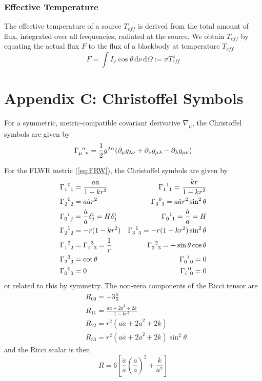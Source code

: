 \subsubsection*{Effective Temperature}
The effective temperature of a source $T_{eff}$ is derived from the total amount of flux, integrated over all frequencies, radiated at the source. We obtain $T_{eff}$ by equating the actual flux $F$ to the flux of a blackbody at temperature $T_{eff}$
\begin{equation}
    F = \int I_{\nu}\cos\theta \,\text{d}\nu\,\text{d}\Omega := \sigma T_{eff}^{4}
    \label{eq:effectivetemperature} 
\end{equation}
\newpage
\section*{Appendix C: Christoffel Symbols}

\par For a symmetric, metric-compatible covariant derivative $\nabla_{\mu}$, the Christoffel symbols are given by
\begin{equation}
    \Gamma_{\mu\;\;\nu}^{\;\;\alpha} = \frac{1}{2}g^{\lambda\alpha}(\partial_{\mu}g_{\lambda\nu}+\partial_{\nu}g_{\mu\lambda}-\partial_{\lambda}g_{\mu\nu})
\end{equation}
\par For the FLWR metric (\ref{eq:FRW}), the Christoffel symbols are given by
\begin{align*}
    & \Gamma_{1\;\;1}^{\;\;0} = \frac{a\dot{a}}{1-kr^{2}} & \Gamma_{1\;\;1}^{\;\;1} = \frac{kr}{1-kr^{2}} \\
    & \Gamma_{2\;\;2}^{\;\;0} = a\dot{a}r^{2} & \Gamma_{3\;\;3}^{\;\;0} = a\dot{a}r^{2}\sin^{2}\theta \\
    & \Gamma_{0\;\;j}^{\;\;i} = \frac{\dot{a}}{a}\delta^{i}_{j}=H\delta^{i}_{j} & \Gamma_{0\;\;1}^{\;\;1} = \frac{\dot{a}}{a} = H \\
    & \Gamma_{2\;\;2}^{\;\;1} = -r(1-kr^{2}) &\Gamma_{3\;\;3}^{\;\;1} = -r(1-kr^{2})\sin^{2}\theta \\
    & \Gamma_{1\;\;2}^{\;\;2} = \Gamma_{1\;\;3}^{\;\;3} = \frac{1}{r} \quad & \Gamma_{3\;\;3}^{\;\;2} = -\sin\theta\cos\theta\\
    & \Gamma_{2\;\;3}^{\;\;3} = \cot\theta  & \Gamma_{0\;\;0}^{\;\;i} = 0\\
    & \Gamma_{0\;\;0}^{\;\;0} = 0 & \Gamma_{i\;\;0}^{\;\;0} = 0\\
\end{align*}
or related to this by symmetry. The non-zero components of the Ricci tensor are
\begin{align*}
    & R_{00} = -3\frac{\ddot{a}}{a} \\
    & R_{11} = \frac{a\ddot{a}+2\dot{a}^{2}+2k}{1-kr^{2}}\\
    & R_{22} = r^{2}(a\ddot{a}+2\dot{a}^{2}+2k)\\
    & R_{33} = r^{2}(a\ddot{a}+2\dot{a}^{2}+2k)\sin^{2}\theta
\end{align*}
and the Ricci scalar is then
\begin{equation*}
    R = 6\left[\frac{\ddot{a}}{a}\left(\frac{\dot{a}}{a}\right)^{2}+\frac{k}{a^{2}}\right]
\end{equation*}

